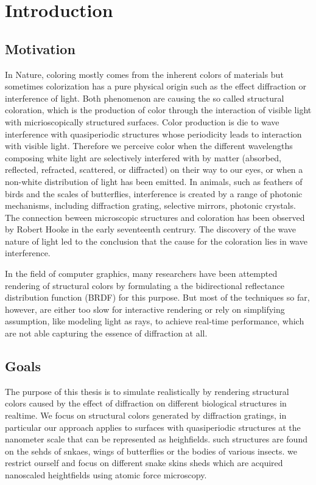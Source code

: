 \section{Introduction}
\subsection{Motivation}
In Nature, coloring mostly comes from the inherent colors of materials but sometimes colorization has a pure physical origin such as the effect diffraction or interference of light. Both phenomenon are causing the so called structural coloration, which is the production of color through the interaction of visible light with micrioscopically structured surfaces. 
Color production is die to wave interference with quasiperiodic structures whose periodicity leads to interaction with visible light. Therefore we perceive color when the different wavelengths composing white light are selectively interfered with by matter (absorbed, reflected, refracted, scattered, or diffracted) on their way to our eyes, or when a non-white distribution of light has been emitted.
In animals, such as feathers of birds and the scales of butterflies, interference is created by a range of photonic mechanisms, including diffraction grating, selective mirrors, photonic crystals.
The connection beween microscopic structures and coloration has been observed by Robert Hooke in the early seventeenth centrury. The discovery of the wave nature of light led to the conclusion that the cause for the coloration lies in wave interference.

In the field of computer graphics, many researchers have been attempted rendering of structural colors by formulating a the bidirectional reflectance distribution function (BRDF) for this purpose. But most of the techniques so far, however, are either too slow for interactive rendering or rely on simplifying assumption, like modeling light as rays, to achieve real-time performance, which are not able capturing the essence of diffraction at all. 

\subsection{Goals}
The purpose of this thesis is to simulate realistically by rendering structural colors caused by the effect of diffraction on different biological structures in realtime. We focus on structural colors generated by diffraction gratings, in particular our approach applies to surfaces with quasiperiodic structures at the nanometer scale that can be represented as heighfields. such structures are found on the sehds of snkaes, wings of butterflies or the bodies of various insects. we restrict ourself and focus on different snake skins sheds which are acquired nanoscaled heightfields using atomic force microscopy. 

